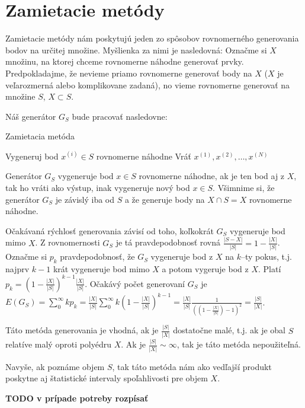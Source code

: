 \section{Zamietacie metódy}

Zamietacie metódy nám poskytujú jeden zo spôsobov rovnomerného generovania bodov na určitej množine.
Myšlienka za nimi je nasledovná: Označme si $X$ množinu, na ktorej chceme rovnomerne náhodne generovať prvky. Predpokladajme, že nevieme priamo rovnomerne generovať body na $X$ ($X$ je veľarozmerná alebo komplikovane zadaná), no vieme rovnomerne generovať na množine $S$, $X \subset S$.

Náš generátor $G_S$ bude pracovať nasledovne:

\begin{algorithm}[H]
	\caption{Zamietacia metóda}
	\label{zamietanie:basic}
	\begin{algorithmic}[1]
			\Repeat Vygeneruj bod $x^{(i)} \in S$ rovnomerne náhodne
		\EndFor
		\State Vráť ${x^{(1)},x^{(2)},\dots,x^{(N)}}$
	\end{algorithmic}
\end{algorithm}
Generátor $G_S$ vygeneruje bod $x \in S$ rovnomerne náhodne, ak je ten bod aj z $X$, tak ho vráti ako výstup, inak vygeneruje nový bod $x \in S$. Všimnime si, že generátor $G_S$ je závislý iba od $S$ a že generuje body na $X \cap S=X$ rovnomerne náhodne.

Očakávaná rýchlosť generovania závisí od toho, koľkokrát $G_S$ vygeneruje bod mimo $X$. Z rovnomernosti $G_S$ je tá pravdepodobnosť rovná $\frac{|S-X|}{|S|} = 1-\frac{|X|}{|S|}$. Označme si $p_k$ pravdepodobnosť, že $G_S$ vygeneruje bod z $X$ na $k$--ty pokus, t.j. najprv $k-1$ krát vygeneruje bod mimo $X$ a potom vygeruje bod z $X$. Platí $p_k= (1-\frac{|X|}{|S|})^{k-1}\frac{|X|}{|S|}$. Očakávý počet generovaní $G_S$ je $E(G_S)=\sum^{\infty}_{0}kp_k=\frac{|X|}{|S|} \sum^{\infty}_{0}k(1-\frac{|X|}{|S|})^{k-1}=\frac{|X|}{|S|} \frac{1}{((1-\frac{|X|}{|S|})-1)^2} = \frac{|S|}{|X|}$.

Táto metóda generovania je vhodná, ak je $\frac{|S|}{|X|}$ dostatočne malé, t.j. ak je obal $S$ relatíve malý oproti polyédru $X$. Ak je $\frac{|S|}{|X|} \sim \infty$, tak je táto metóda nepoužiteľná.

Navyše, ak poznáme objem $S$, tak táto metóda nám ako vedľajší produkt poskytne aj štatistické intervaly spoľahlivosti pre objem $X$.

\textbf{TODO v prípade potreby rozpísať}

